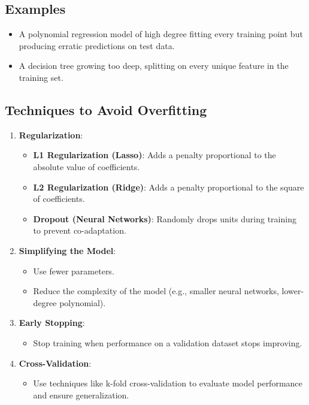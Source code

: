 \subsection*{Examples}
\begin{itemize}
    \item A polynomial regression model of high degree fitting every training point but producing erratic predictions on test data.
    \item A decision tree growing too deep, splitting on every unique feature in the training set.
\end{itemize}

\subsection*{Techniques to Avoid Overfitting}
\begin{enumerate}
    \item \textbf{Regularization}:
    \begin{itemize}
        \item \textbf{L1 Regularization (Lasso)}: Adds a penalty proportional to the absolute value of coefficients.
        \item \textbf{L2 Regularization (Ridge)}: Adds a penalty proportional to the square of coefficients.
        \item \textbf{Dropout (Neural Networks)}: Randomly drops units during training to prevent co-adaptation.
    \end{itemize}
    \item \textbf{Simplifying the Model}:
    \begin{itemize}
        \item Use fewer parameters.
        \item Reduce the complexity of the model (e.g., smaller neural networks, lower-degree polynomial).
    \end{itemize}
    \item \textbf{Early Stopping}:
    \begin{itemize}
        \item Stop training when performance on a validation dataset stops improving.
    \end{itemize}
    \item \textbf{Cross-Validation}:
    \begin{itemize}
        \item Use techniques like k-fold cross-validation to evaluate model performance and ensure generalization.
    \end{itemize}

\end{enumerate}
